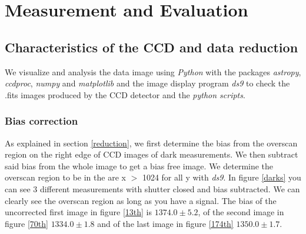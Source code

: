 \section{Measurement and Evaluation}
\subsection{Characteristics of the CCD and data reduction}
We visualize and analysis the data image using \textit{Python} with the packages \textit{astropy}, \textit{ccdproc}, \textit{numpy} and \textit{matplotlib} and the image display program \textit{ds9} to check the .fits images produced by the CCD detector and the \textit{python scripts}.
\subsubsection{Bias correction}
As explained in section \ref{reduction}, we first determine the bias from the overscan region on the right edge of CCD images of dark measurements. We then subtract said bias from the whole image to get a bias free image. We determine the overscan region to be in the are x $>$ 1024 for all y with \textit{ds9}. In figure \ref{darks} you can see 3 different measurements with shutter closed and bias subtracted. We can clearly see the overscan region as long as you have a signal. The bias of the uncorrected first image in figure \ref{13th} is $1374.0 \pm 5.2$, of the second image in figure \ref{70th}  $1334.0 \pm 1.8$ and of the last image in figure \ref{174th} $1350.0 \pm 1.7$. \\
